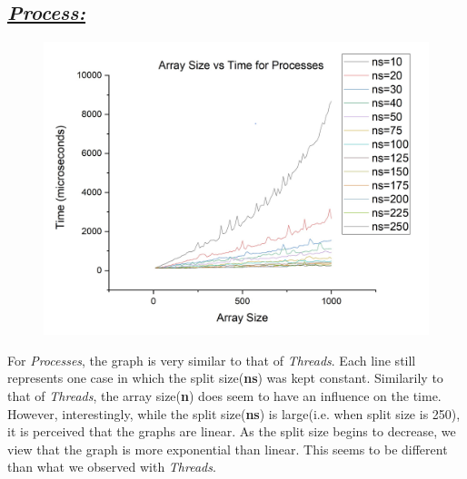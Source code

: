\documentclass{article}
\begin{document}
            \subsection*{\color{blue}\textit{\underline{Process:}}\color{black}}
                \begin{figure}[H]
                    \centering
                    \includegraphics[width=19cm]{svt-Processes}
                \end{figure}
                For \color{blue}\textit{Processes}\color{black}, the graph is very similar to that of \color{red}\textit{Threads}\color{black}. Each line still represents one case in which the split size(\textbf{ns}) was kept constant.
                Similarily to that of \color{red}\textit{Threads}\color{black}, the array size(\textbf{n}) does seem to have an influence on the time.
                However, interestingly, while the split size(\textbf{ns}) is large(i.e. when split size is 250), it is perceived that the graphs are linear. As the split size begins to decrease, we view that the graph is more exponential than linear. \newline
                This seems to be different than what we observed with \color{red}\textit{Threads}\color{black}.
            \pagebreak
\end{document}
